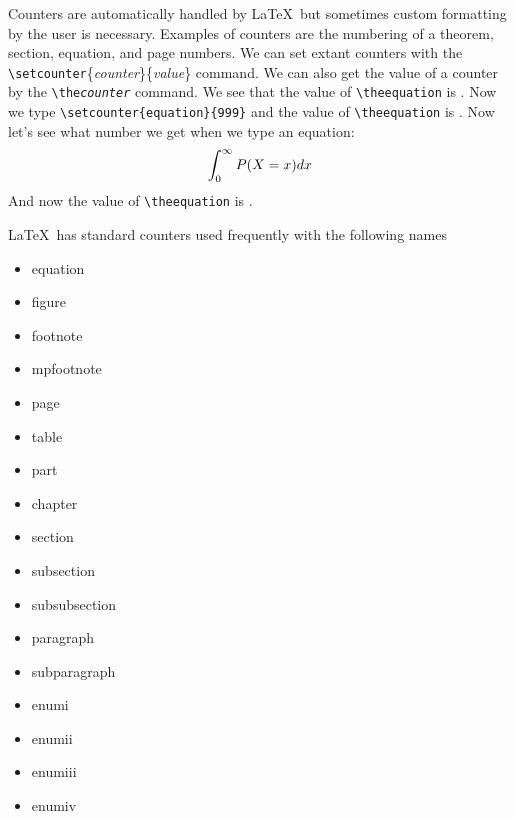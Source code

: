 \documentclass{amsart}
\begin{document}
	Counters are automatically handled by \LaTeX\ but sometimes
	custom formatting by the user is necessary.
	Examples of counters are the numbering of a theorem,
	section, equation, and page numbers.
	We can set extant counters with the
	\verb+\setcounter+\{\emph{counter}\}\{\emph{value}\} command. 
	We can also get the value of a counter by the 
	\texttt{\textbackslash the\emph{counter}} command.
	We see that the value of \verb+\theequation+ is \theequation. 
	Now we type \verb+\setcounter{equation}{999}+%
	\setcounter{equation}{999}
	and the value of \verb+\theequation+ is \theequation. 
	Now let's see what number we get when we type an equation:
	\begin{equation}
		\int_0^{\infty} P(X = x) dx
	\end{equation}
	And now the value of \verb+\theequation+ is \theequation. 

	\LaTeX\ has standard counters used frequently with the following names \\
	\hfill	
	\begin{minipage}[t]{3 cm}
		\begin{itemize}
			\item equation
			\item figure
			\item footnote
			\item mpfootnote
			\item page
			\item table
		\end{itemize}
	\end{minipage} 
	\hfill
	\begin{minipage}[t]{4 cm}
		\begin{itemize}
			\item part
			\item chapter
			\item section 
			\item subsection
			\item subsubsection
			\item paragraph
		\end{itemize}
	\end{minipage} 
	\hfill
	\begin{minipage}[t]{4 cm}
		\begin{itemize}
			\item subparagraph
			\item enumi
			\item enumii
			\item enumiii
			\item enumiv
		\end{itemize}
	\end{minipage} \hfill
	
\end{document}
